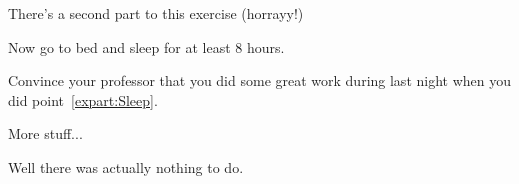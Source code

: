 \documentclass[11pt,a4paper]{article}
\begin{document}
There's a second part to this exercise (horrayy!)

\begin{exenumerate} %
\item \label{expart:Sleep} Now go to bed and sleep for at least 8 hours.
\item Convince your professor that you did some great work during last night when you did
  point~\ref{expart:Sleep}.
\end{exenumerate}



More stuff...

\begin{solution} %
  Well there was actually nothing to do.
\end{solution}
\end{document}
